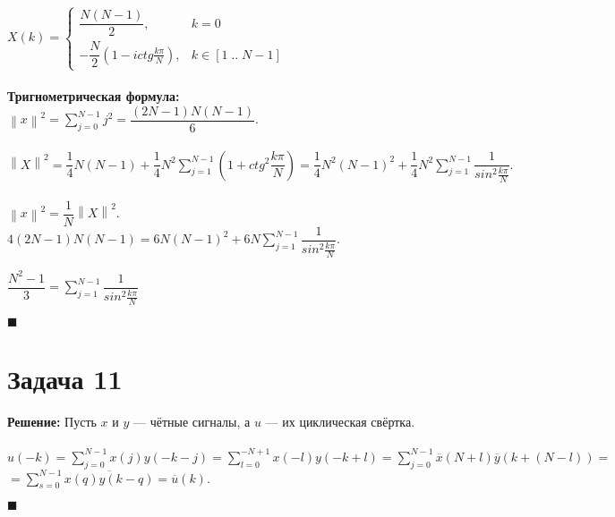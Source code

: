\documentclass{article}
\newcommand\proofend{\begin{flushright}$\blacksquare$\end{flushright}}
\begin{document}
{	$X(k) = \left\{\begin{matrix}
		\dfrac{N(N - 1)}{2}, & k = 0 \\
		-\dfrac{N}{2}(1 - ictg\frac{k\pi}{N}), & k \in [1\;..\;N-1]
	\end{matrix}\right.$ \\ \\


	\textbf{Тригнометрическая формула:}\\

	$\left \| x \right \|^2 = \sum\limits_{j = 0}^{N - 1} j^2 = \dfrac{(2N - 1)N(N - 1)}{6}$.\\ \\

	$\left \| X \right \|^2 = \dfrac{1}{4}N(N-1) + \dfrac{1}{4}N^2\sum\limits_{j = 1}^{N - 1}(1 + ctg^2\dfrac{k\pi}{N}) = \dfrac{1}{4}N^2(N-1)^2 + \dfrac{1}{4}N^2\sum\limits_{j = 1}^{N - 1}\dfrac{1}{sin^2\frac{k\pi}{N}}.$ \\ \\

	$\left \| x \right \|^2 = \dfrac{1}{N}\left \| X \right \|^2 $. \\

	$4(2N - 1)N(N - 1) = 6N(N - 1)^2 + 6N\sum\limits_{j = 1}^{N - 1}\dfrac{1}{sin^2\frac{k\pi}{N}}$.

	$\dfrac{N^2 - 1}{3} = \sum\limits_{j = 1}^{N - 1}\dfrac{1}{sin^2\frac{k\pi}{N}}$

	\proofend

	\section*{Задача 11}
	\textbf{Решение:} Пусть $x$ и $y$ --- чётные сигналы, а $u$ --- их циклическая свёртка.\\ \\

	$u(-k) = \sum\limits_{j = 0}^{N - 1}x(j)y(-k - j) = \sum\limits_{l = 0}^{-N + 1} x(-l)y(-k + l) =
	\sum\limits_{j = 0}^{N - 1}\overline{x}(N + l) \overline{y}(k + (N - l)) = $\\
	$= \sum\limits_{s = 0}^{N - 1}\overline{x(q)y(k - q)} = \overline{u}(k)$.
	\proofend

\pagebreak

}
\end{document}
